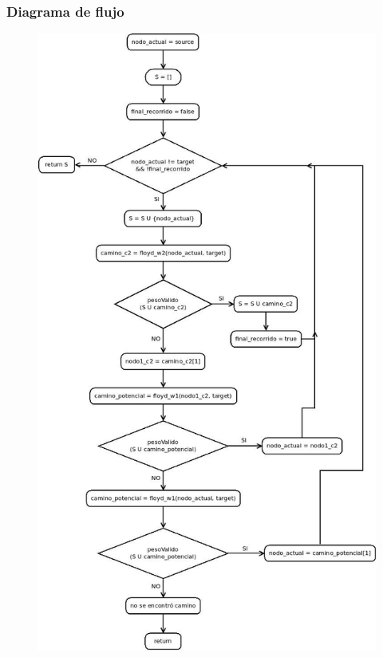 \subsubsection{Diagrama de flujo}
\begin{figure}[!hp]
	\centering
 	\includegraphics[height=\textheight]{img/flujo_greedy.jpeg}
\end{figure}



